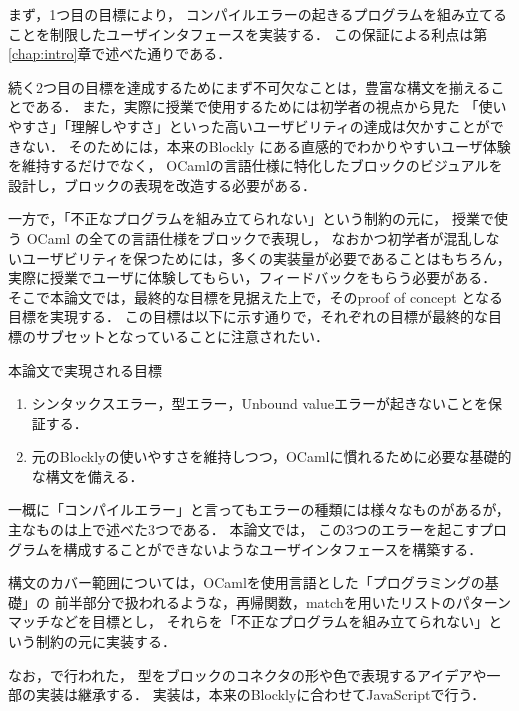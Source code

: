 まず，1つ目の目標により，
コンパイルエラーの起きるプログラムを組み立てることを制限したユーザインタフェースを実装する．
この保証による利点は第\ref{chap:intro}章で述べた通りである．

続く2つ目の目標を達成するためにまず不可欠なことは，豊富な構文を揃えることである．
また，実際に授業で使用するためには初学者の視点から見た
「使いやすさ」「理解しやすさ」といった高いユーザビリティの達成は欠かすことができない．
そのためには，本来のBlockly にある直感的でわかりやすいユーザ体験を維持するだけでなく，
OCamlの言語仕様に特化したブロックのビジュアルを設計し，ブロックの表現を改造する必要がある．

一方で，「不正なプログラムを組み立てられない」という制約の元に，
授業で使う OCaml の全ての言語仕様をブロックで表現し，
なおかつ初学者が混乱しないユーザビリティを保つためには，多くの実装量が必要であることはもちろん，
実際に授業でユーザに体験してもらい，フィードバックをもらう必要がある．
そこで本論文では，最終的な目標を見据えた上で，そのproof of concept となる目標を実現する．
この目標は以下に示す通りで，それぞれの目標が最終的な目標のサブセットとなっていることに注意されたい．
\begin{itembox}[l]{本論文で実現される目標}
  \begin {enumerate}
    \item シンタックスエラー，型エラー，Unbound valueエラーが起きないことを保証する．
    \item 元のBlocklyの使いやすさを維持しつつ，OCamlに慣れるために必要な基礎的な構文を備える．
  \end {enumerate}
\end{itembox}

一概に「コンパイルエラー」と言ってもエラーの種類には様々なものがあるが，主なものは上で述べた3つである．
本論文では，
この3つのエラーを起こすプログラムを構成することができないようなユーザインタフェースを構築する．

構文のカバー範囲については，OCamlを使用言語とした「プログラミングの基礎」\cite{AsaiBook}の
前半部分で扱われるような，再帰関数，matchを用いたリストのパターンマッチなどを目標とし，
それらを「不正なプログラムを組み立てられない」という制約の元に実装する．

なお，\cite{Typed-Blockly}で行われた，
型をブロックのコネクタの形や色で表現するアイデアや一部の実装は継承する．
実装は，本来のBlocklyに合わせてJavaScriptで行う．
